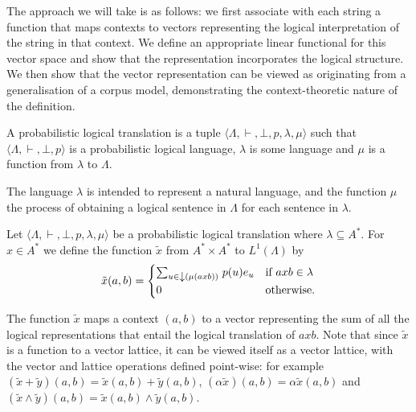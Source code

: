 The approach we will take is as follows: we first associate with each string a function that maps contexts to vectors representing the logical interpretation of the string in that context. We define an appropriate linear functional for this vector space and show that the representation incorporates the logical structure. We then show that the vector representation can be viewed as originating from a generalisation of a corpus model, demonstrating the context-theoretic nature of the definition.

\begin{defn}
A probabilistic logical translation is a tuple $\langle\Lambda,\vdash, \bot, p, \lambda, \mu\rangle$ such that $\langle\Lambda,\vdash, \bot, p\rangle$ is a probabilistic logical language, $\lambda$ is some language and $\mu$ is a function from $\lambda$ to $\Lambda$.
\end{defn}

The language $\lambda$ is intended to represent a natural language, and the function $\mu$ the process of obtaining a logical sentence in $\Lambda$ for each sentence in $\lambda$.

\begin{defn}
\label{x-tilde}
Let $\langle\Lambda,\vdash, \bot, p, \lambda, \mu\rangle$ be a probabilistic logical translation where $\lambda \subseteq A^*$. For $x\in A^*$ we define the function $\tilde{x}$ from $A^*\times A^*$ to $L^1(\Lambda)$ by
$$\tilde{x}(a,b) = \begin{cases}
\sum_{u \in \left\downarrow(\mu(axb))\right.} p(u)e_u & \text{if $axb \in \lambda$}\\
0 & \text{otherwise.}
\end{cases}$$
\end{defn}

The function $\tilde{x}$ maps a context $(a,b)$ to a vector representing the sum of all the logical representations that entail the logical translation of $axb$. Note that since $\tilde{x}$ is a function to a vector lattice, it can be viewed itself as a vector lattice, with the vector and lattice operations defined point-wise: for example $(\tilde{x} + \tilde{y})(a,b) = \tilde{x}(a,b) + \tilde{y}(a,b)$, $(\alpha \tilde{x})(a,b) = \alpha \tilde{x}(a,b)$ and $(\tilde{x} \land \tilde{y})(a,b) = \tilde{x}(a,b) \land \tilde{y}(a,b)$.

